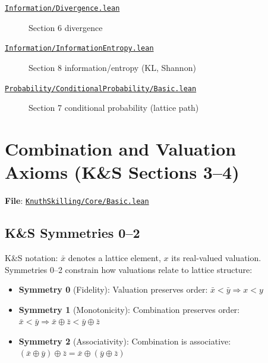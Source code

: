 \documentclass[11pt]{article}
\theoremstyle{definition}
\theoremstyle{remark}
\begin{document}
\begin{description}
\medskip
\item[\href{https://github.com/zariuq/ks-foundations-of-inference/blob/main/KnuthSkilling/Information/Divergence.lean}{\texttt{Information/Divergence.lean}}] Section 6 divergence
\item[\href{https://github.com/zariuq/ks-foundations-of-inference/blob/main/KnuthSkilling/Information/InformationEntropy.lean}{\texttt{Information/InformationEntropy.lean}}] Section 8 information/entropy (KL, Shannon)

\medskip
\item[{\footnotesize\href{https://github.com/zariuq/ks-foundations-of-inference/blob/main/KnuthSkilling/Probability/ConditionalProbability/Basic.lean}{\texttt{Probability/ConditionalProbability/Basic.lean}}}] Section 7 conditional probability (lattice path)
\end{description}

\section{Combination and Valuation Axioms (K\&S Sections 3--4)}

\textbf{File}: \href{https://github.com/zariuq/ks-foundations-of-inference/blob/main/KnuthSkilling/Core/Basic.lean}{\texttt{KnuthSkilling/Core/Basic.lean}}

\subsection{K\&S Symmetries 0--2}

K\&S notation: $\bar{x}$ denotes a lattice element, $x$ its real-valued valuation.
Symmetries 0--2 constrain how valuations relate to lattice structure:
\begin{itemize}
\item \textbf{Symmetry 0} (Fidelity): Valuation preserves order: $\bar{x} < \bar{y} \Rightarrow x < y$
\item \textbf{Symmetry 1} (Monotonicity): Combination preserves order: $\bar{x} < \bar{y} \Rightarrow \bar{x} \oplus \bar{z} < \bar{y} \oplus \bar{z}$
\item \textbf{Symmetry 2} (Associativity): Combination is associative: $(\bar{x} \oplus \bar{y}) \oplus \bar{z} = \bar{x} \oplus (\bar{y} \oplus \bar{z})$
\end{itemize}
\end{document}

